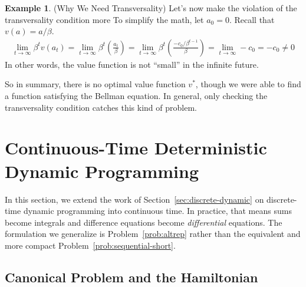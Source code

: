 \documentclass[12pt]{article}
\numberwithin{equation}{section} %
\theoremstyle{plain}
\theoremstyle{definition}
\newtheorem{ex}[thm]{Example}
\theoremstyle{remark}
\begin{document}
\begin{ex}{(Why We Need Transversality)}
Let's now make the violation of the transversality condition more
To simplify the math, let $a_0=0$. Recall that $v(a) = a/\beta$.
\begin{align*}
  \lim_{t\rightarrow\infty} \beta^t v(a_t)
  = \lim_{t\rightarrow\infty} \beta^t \left(\frac{a_t}{\beta}\right)
  = \lim_{t\rightarrow\infty} \beta^t
  \left(
  \frac{-c_0/\beta^{t-1}}{\beta}
  \right)
  = \lim_{t\rightarrow\infty}
  -c_0
  = -c_0 \neq 0
\end{align*}
In other words, the value function is not ``small'' in the infinite
future.

So in summary, there is no optimal value function $v^*$, though we were
able to find a function satisfying the Bellman equation. In general,
only checking the transversality condition catches this kind of problem.
\end{ex}



\clearpage
\section{Continuous-Time Deterministic Dynamic Programming}
\label{sec:continuous-dynamic}

In this section, we extend the work of
Section~\ref{sec:discrete-dynamic} on discrete-time dynamic programming
into continuous time. In practice, that means sums become integrals and
difference equations become \emph{differential} equations.  The
formulation we generalize is Problem~\ref{prob:altrep} rather than the
equivalent and more compact Problem~\ref{prob:sequential-short}.

\subsection{Canonical Problem and the Hamiltonian}
\end{document}
